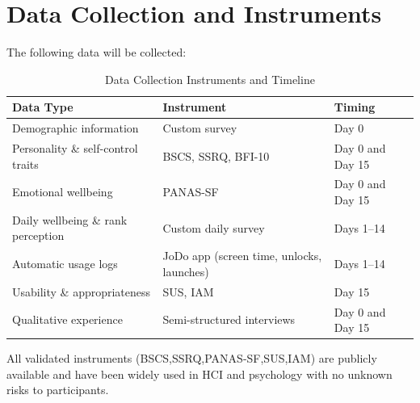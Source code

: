 \documentclass[12pt,a4paper]{article}
\begin{document}
\section{Data Collection and Instruments}
The following data will be collected:
\begin{table}[h]
\centering
\caption{Data Collection Instruments and Timeline}
\label{tab:data-collection}
\renewcommand{\arraystretch}{1.4}
\begin{tabular}{>{\raggedright\arraybackslash}p{4.5cm} 
                >{\raggedright\arraybackslash}p{5.5cm} 
                >{\raggedright\arraybackslash}p{3cm}}
\toprule
\textbf{Data Type} & \textbf{Instrument} & \textbf{Timing} \\
\midrule
\rowcolor{lightgray}
Demographic information 
    & Custom survey 
    & Day 0 \\
Personality \& self-control traits 
    & BSCS, SSRQ, BFI-10 
    & Day 0 and Day 15 \\
\rowcolor{lightgray}
Emotional wellbeing 
    & PANAS-SF 
    & Day 0 and Day 15 \\
Daily wellbeing \& rank perception 
    & Custom daily survey 
    & Days 1--14 \\
\rowcolor{lightgray}
Automatic usage logs 
    & JoDo app (screen time, unlocks, launches) 
    & Days 1--14 \\
Usability \& appropriateness 
    & SUS, IAM 
    & Day 15 \\
\rowcolor{lightgray}
Qualitative experience 
    & Semi-structured interviews 
    & Day 0 and Day 15 \\
\bottomrule
\end{tabular}
\end{table}
All validated instruments (BSCS,SSRQ,PANAS-SF,SUS,IAM) are publicly available and have been widely used in HCI and psychology with no unknown risks to participants.
\end{document}
